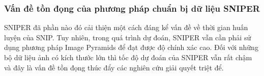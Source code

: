 {    \subsubsection{Vấn đề tồn đọng của phương pháp chuẩn bị dữ liệu SNIPER }
    SNIPER  đã phần nào đó cải thiện một cách đáng kể vấn đề về thời gian huấn luyện của SNIP.
    Tuy nhiên, trong quá trình dự đoán, SNIPER  vẫn cần phải sử dụng phương pháp Image Pyramids để đạt được độ chính xác cao.
    Đối với những bộ dữ liệu ảnh có kích thước lớn thì tốc độ dự đoán của SNIPER  vẫn rất chậm và đây là vấn đề tồn đọng thúc đẩy các nghiên cứu giải quyết triệt để.
}